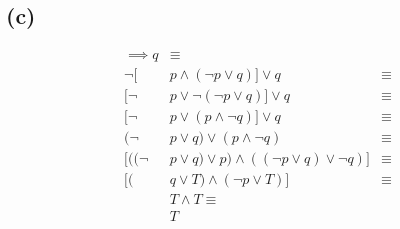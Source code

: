 \documentclass{article}
\begin{document}
\subsection{(c)}
\begin{align*}
	[       & p \land (p \implies q)] \implies q                     & \equiv \\
	\neg [  & p \land (\neg p \lor q)] \lor q                        & \equiv \\
	[\neg   & p \lor \neg (\neg p \lor q)] \lor q                    & \equiv \\
	[\neg   & p \lor (p \land \neg q)] \lor q                        & \equiv \\
	(\neg   & p \lor q) \lor (p \land \neg q)                        & \equiv \\
	[((\neg & p \lor q) \lor p) \land ((\neg p \lor q) \lor \neg q)] & \equiv \\
	[(      & q \lor T) \land (\neg p \lor T)]                       & \equiv \\
	        & T \land T \equiv                                                \\
	        & T
\end{align*}
\end{document}
